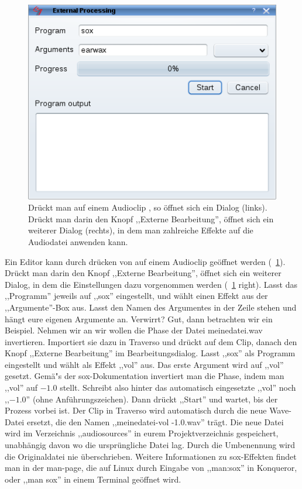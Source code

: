 \begin{figure}
	\centering
	\includegraphics[width=\textwidth]{../images/external00}
	\caption{Drückt man auf einem Audioclip , so öffnet sich ein Dialog (links). Drückt man darin den Knopf ,,Externe Bearbeitung'', öffnet sich ein weiterer Dialog (rechts), in dem man zahlreiche Effekte auf die Audiodatei anwenden kann.}
	\label{fig_external01}
\end{figure}

Ein Editor kann durch drücken von  auf einem Audioclip geöffnet werden (\FigB~\ref{fig_external01}). Drückt man darin den Knopf ,,Externe Bearbeitung'', öffnet sich ein weiterer Dialog, in dem die Einstellungen dazu vorgenommen werden (\FigB~\ref{fig_external01} right). Lasst das ,,Programm'' jeweils auf ,,sox'' eingestellt, und wählt einen Effekt aus der ,,Argumente''-Box aus. Lasst den Namen des Argumentes in der Zeile stehen und hängt eure eigenen Argumente an. Verwirrt? Gut, dann betrachten wir ein Beispiel. Nehmen wir an wir wollen die Phase der Datei meinedatei.wav invertieren. Importiert sie dazu in Traverso und drückt  auf dem Clip, danach den Knopf ,,Externe Bearbeitung'' im Bearbeitungsdialog. Lasst ,,sox'' als Programm eingestellt und wählt als Effekt ,,vol'' aus. Das erste Argument wird auf ,,vol'' gesetzt. Gemä"s der sox-Dokumentation invertiert man die Phase, indem man ,,vol'' auf $-1.0$ stellt. Schreibt also hinter das automatisch eingesetzte ,,vol'' noch ,,$-1.0$'' (ohne Anführungszeichen). Dann drückt ,,Start'' und wartet, bis der Prozess vorbei ist. Der Clip in Traverso wird automatisch durch die neue Wave-Datei ersetzt, die den Namen ,,meinedatei-vol -1.0.wav'' trägt. Die neue Datei wird im Verzeichnis ,,audiosources'' in eurem Projektverzeichnis gespeichert, unabhängig davon wo die ursprüngliche Datei lag. Durch die Umbenennung wird die Originaldatei nie überschrieben. Weitere Informationen zu sox-Effekten findet man in der man-page, die auf Linux durch Eingabe von ,,man:sox'' in Konqueror, oder ,,man sox'' in einem Terminal geöffnet wird.